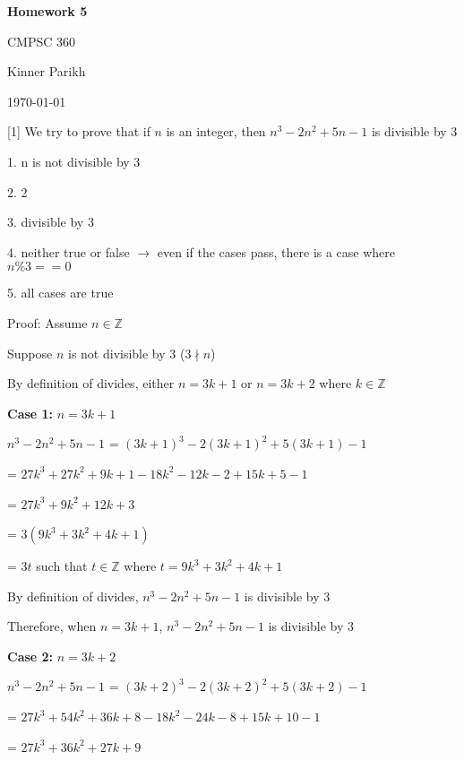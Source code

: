 \documentclass{article} %
\newcommand{\question}[2][]{\begin{flushleft}
        \textbf{Question #1}: #2
\end{flushleft}}
\newcommand{\maketitletwo}[2][]{\begin{center}
        \Large{\textbf{Homework #1}
            
            CMPSC 360} %
        \vspace{5pt}
        
        \normalsize{Kinner Parikh  %
        
        \today}        %
        \vspace{15pt}
        
\end{center}}
\begin{document}
    \maketitletwo[5]  %

                                                               
    
    \question[1]{ We try to prove that if $n$ is an integer, then $n^3-2n^2+5n-1$ is divisible by 3}

    1. n is not divisible by 3

    2. 2

    3. divisible by 3

    4. neither true or false $\rightarrow$ even if the cases pass, there is a case where $n \% 3 == 0$

    5. all cases are true


    Proof: Assume $n \in \mathbb{Z}$

    Suppose $n$ is not divisible by 3 ($3 \nmid n$)

    By definition of divides, either $n = 3k + 1$ or $n = 3k +2$ where $k \in \mathbb{Z}$

    \textbf{Case 1:} $n = 3k + 1$

    $n^3-2n^2+5n-1$ = $(3k + 1)^3 - 2(3k + 1)^2 + 5(3k + 1) - 1$

    \tabto*{3.4cm} = $27k^3 + 27k^2 + 9k + 1 - 18k^2 - 12k - 2 + 15k + 5 - 1$

    \tabto*{3.4cm} = $27k^3 + 9k^2 + 12k + 3$

    \tabto*{3.4cm} = $3(9k^3 + 3k^2 + 4k + 1)$

    \tabto*{3.4cm} = $3t$ such that $t \in \mathbb{Z}$ where $t = 9k^3 + 3k^2 + 4k + 1$

    By definition of divides, $n^3-2n^2+5n-1$ is divisible by 3

    Therefore, when $n = 3k + 1$, $n^3-2n^2+5n-1$ is divisible by 3

    \textbf{Case 2:} $n = 3k + 2$

    $n^3-2n^2+5n-1$ = $(3k + 2)^3 - 2(3k + 2)^2 + 5(3k + 2) - 1$
    
    \tabto*{3.4cm} = $27k^3 + 54k^2 + 36k + 8 - 18k^2 - 24k - 8 + 15k + 10 - 1$

    \tabto*{3.4cm} = $27k^3 + 36k^2 + 27k + 9$
\end{document}
